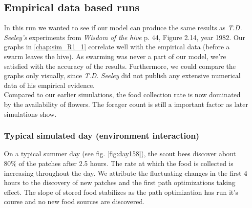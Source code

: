 \subsection{Empirical data based runs}
	In this run we wanted to see if our model can produce the same results as \textit{T.D. Seeley's} experiments from \textit{Wisdom of the hive} p. 44, Figure  2.14, year 1982. Our graphs in \ref{chap:sim_R1_1} correlate well with the empirical data (before a swarm leaves the hive). As swarming was never a part of our model, we're satisfied with the accuracy of the results. Furthermore, we could compare the graphs only visually, since \textit{T.D. Seeley} did not publish any  extensive numerical data of his empirical evidence.\\
	Compared to our earlier simulations, the food collection rate is now dominated by the availability of flowers. The forager count is still a important factor as later simulations show.
	
	\subsubsection{Typical simulated day (environment interaction)}
		On a typical summer day (see fig. \ref{fig:day158}), the scout bees discover about $80\%$ of the patches after 2.5 hours. The rate at which the food is collected is increasing throughout the day. We attribute the fluctuating changes in the first 4 hours to the discovery of new patches and the first path optimizations taking effect. The slope of stored food stabilizes as the path optimization has run it's course and no new food sources are discovered.\\
		
